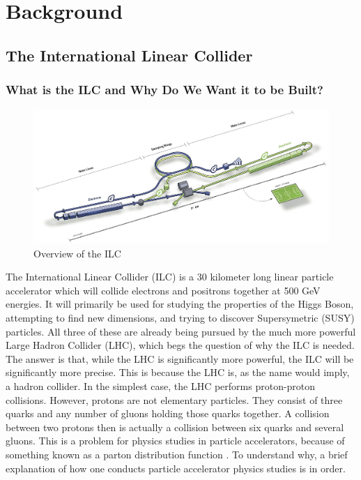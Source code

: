 \documentclass{report}
\begin{document}
    \chapter{ Background }
         \setcounter{page}{1}
        \section{ The International Linear Collider }
            \subsection{ What is the ILC and Why Do We Want it to be Built? }
                \begin{figure}[h] 
                    \includegraphics[width=\textwidth]{ilcoverview}
                    \centering
                    \caption{Overview of the ILC}
                    \label{fig:ilcoverview}
                \end{figure}

                The International Linear Collider (ILC) is a 30 kilometer long linear particle accelerator \cite{specs} which will collide electrons and positrons together at 500 GeV energies. It will primarily be used for studying the properties of the Higgs Boson, attempting to find new dimensions, and trying to discover Supersymetric (SUSY) particles. All three of these are already being pursued by the much more powerful Large Hadron Collider (LHC), which begs the question of why the ILC is needed. The answer is that, while the LHC is significantly more powerful, the ILC will be significantly more precise. This is because the LHC is, as the name would imply, a hadron collider. In the simplest case, the LHC performs proton-proton collisions. However, protons are not elementary particles. They consist of three quarks and any number of gluons holding those quarks together. A collision between two protons then is actually a collision between six quarks and several gluons. This is a problem for physics studies in particle accelerators, because of something known as a parton distribution function \cite{parton}. To understand why, a brief explanation of how one conducts particle accelerator physics studies is in order.
\end{document}
